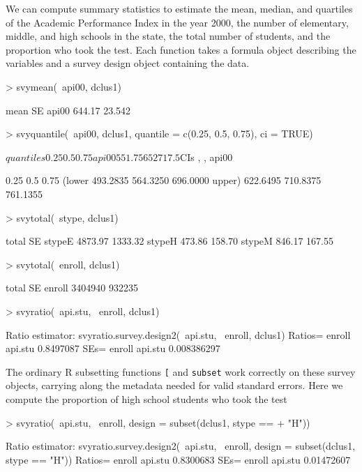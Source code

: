 \documentclass{article}
\begin{document}
We can compute summary statistics to estimate the mean, median, and
quartiles of the Academic Performance Index in the year 2000, the
number of elementary, middle, and high schools in the state, the total
number of students, and the proportion who took the test.  Each
function takes a formula object describing the variables and a survey
design object containing the data.
\begin{Schunk}
\begin{Sinput}
> svymean(~api00, dclus1)
\end{Sinput}
\begin{Soutput}
        mean     SE
api00 644.17 23.542
\end{Soutput}
\begin{Sinput}
> svyquantile(~api00, dclus1, quantile = c(0.25, 0.5, 0.75), ci = TRUE)
\end{Sinput}
\begin{Soutput}
$quantiles
        0.25 0.5  0.75
api00 551.75 652 717.5

$CIs
, , api00

           0.25      0.5     0.75
(lower 493.2835 564.3250 696.0000
upper) 622.6495 710.8375 761.1355
\end{Soutput}
\begin{Sinput}
> svytotal(~stype, dclus1)
\end{Sinput}
\begin{Soutput}
         total      SE
stypeE 4873.97 1333.32
stypeH  473.86  158.70
stypeM  846.17  167.55
\end{Soutput}
\begin{Sinput}
> svytotal(~enroll, dclus1)
\end{Sinput}
\begin{Soutput}
         total     SE
enroll 3404940 932235
\end{Soutput}
\begin{Sinput}
> svyratio(~api.stu, ~enroll, dclus1)
\end{Sinput}
\begin{Soutput}
Ratio estimator: svyratio.survey.design2(~api.stu, ~enroll, dclus1)
Ratios=
           enroll
api.stu 0.8497087
SEs=
             enroll
api.stu 0.008386297
\end{Soutput}
\end{Schunk}

The ordinary R subsetting functions \verb'[' and \texttt{subset} work
correctly on these survey objects, carrying along the metadata needed
for valid standard errors. Here we compute the proportion of high
school students who took the test
\begin{Schunk}
\begin{Sinput}
> svyratio(~api.stu, ~enroll, design = subset(dclus1, stype == 
+     "H"))
\end{Sinput}
\begin{Soutput}
Ratio estimator: svyratio.survey.design2(~api.stu, ~enroll, design = subset(dclus1, 
    stype == "H"))
Ratios=
           enroll
api.stu 0.8300683
SEs=
            enroll
api.stu 0.01472607
\end{Soutput}
\end{Schunk}
\end{document}
